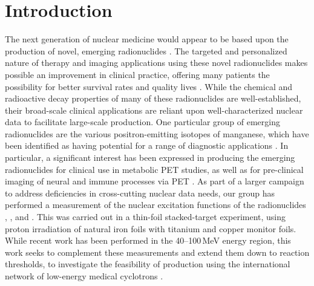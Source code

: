 
\section{\label{sec:intro_fe}Introduction}

The next generation of nuclear medicine would appear to be based upon the production of novel, emerging radionuclides \cite{Qaim201731}. 
The targeted and personalized nature of therapy and imaging applications using these novel radionuclides  makes possible an improvement in clinical practice, offering many patients the possibility for better survival rates and quality lives \cite{Mulford2005,Muller2014}.
While the chemical and radioactive decay properties of many of these radionuclides are well-established, their broad-scale  clinical applications are reliant upon well-characterized nuclear data to facilitate large-scale   production. 
One particular group of  emerging radionuclides are the various positron-emitting isotopes of manganese, which have been identified as having potential for a range of diagnostic applications \cite{J.2013,Graves2015,Lewis2015,PhysRevC.96.014613,Wooten2017,Hernandez2017}.
In particular, a significant interest has been expressed in producing the emerging radionuclides  for clinical use in metabolic PET studies, as well as   for pre-clinical imaging of neural and immune processes via PET \cite{Graves2016}. 
As part of a larger campaign to address deficiencies in cross-cutting nuclear data needs, our group has performed a   measurement of the   nuclear excitation functions of the radionuclides ,   , and .
This was carried out in a  thin-foil stacked-target experiment, using proton irradiation of natural iron foils with titanium and copper monitor foils.
While recent work has been performed in the 40--100\,MeV energy region, this work seeks to complement these measurements and extend them down to reaction thresholds, to investigate the feasibility of production using the international network   of low-energy medical cyclotrons   \cite{Graves2016}. 


